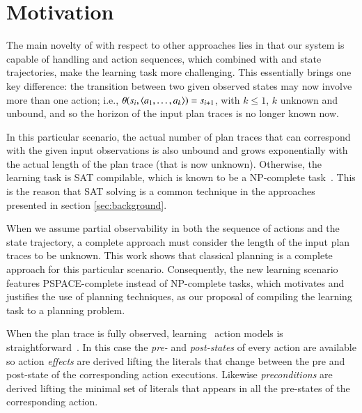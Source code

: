 
\section{Motivation}
\label{sec:motivation}

The main novelty of \FAMA with respect to other approaches lies in that our system is capable of handling \PO and \NO action sequences, which combined with \PO and \NO state trajectories, make the learning task more challenging. This essentially brings one key difference: the transition between two given observed states may now involve more than one action; i.e., $\theta(s_i,{\langle a_1,\ldots,a_k \rangle})=s_{i+1}$, with $k \leq 1$, $k$ unknown and unbound, and so the horizon of the input plan traces is no longer known now.

In this particular scenario, the actual number of plan traces that can correspond with the given input observations is also unbound and grows exponentially with the actual length of the plan trace (that is now unknown). Otherwise, the learning task is SAT compilable, which is known to be a NP-complete task~\cite{russell2016artificial}. This is the reason that SAT solving is a common technique in the approaches presented in section \ref{sec:background}.

When we assume partial observability in both the sequence of actions and the state trajectory, a complete approach must consider the length of the input plan traces to be unknown. This work shows that classical planning is a complete approach for this particular scenario. Consequently, the new learning scenario features PSPACE-complete instead of NP-complete tasks, which motivates and justifies the use of planning techniques, as our proposal of compiling the learning task to a planning problem.

When the plan trace is fully observed, learning \strips\ action models is straightforward~\cite{jimenez2012review}. In this case the {\em pre-} and {\em post-states} of every action are available so action {\em effects} are derived lifting the literals that change between the pre and post-state of the corresponding action executions. Likewise {\em preconditions} are derived lifting the minimal set of literals that appears in all the pre-states of the corresponding action.



